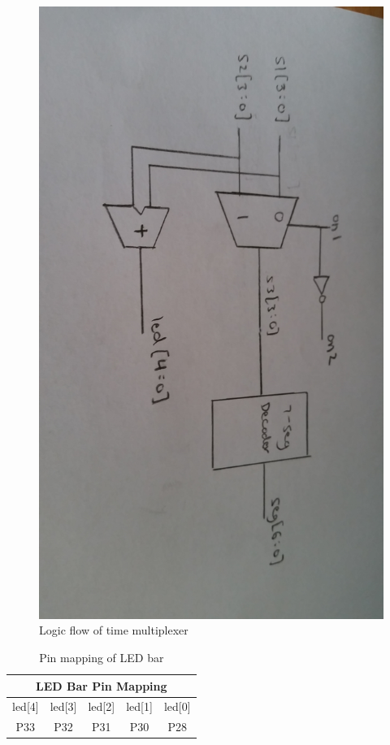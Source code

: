 \documentclass[11pt]{article}
\begin{document}
\begin{figure}[h!]
\centering
\includegraphics[scale=0.11]{logic.jpg}
\caption{Logic flow of time multiplexer}
\label{fig:logic}
\end{figure} 


\begin{table}[h]
\centering
\begin{tabular}{|c|c|c|c|c|}
\hline
\multicolumn{5}{|c|}{\textbf{LED Bar Pin Mapping}}             \\ \hline
led{[}4{]} & led{[}3{]} & led{[}2{]} & led{[}1{]} & led{[}0{]} \\ \hline
P33        & P32        & P31        & P30        & P28        \\ \hline
\end{tabular}
\caption{Pin mapping of LED bar}
\label{table:pinmap_ledbar}
\end{table}
\end{document}
